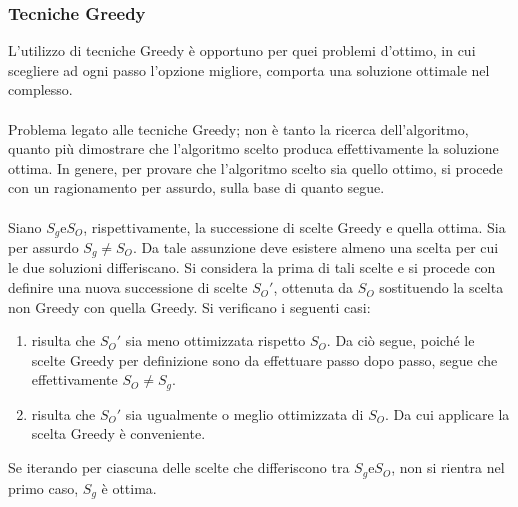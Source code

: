 \documentclass{subfiles}
\begin{document}
\subsubsection{Tecniche Greedy}
L'utilizzo di tecniche Greedy è opportuno per quei problemi d'ottimo, in cui scegliere ad ogni passo l'opzione migliore, comporta una soluzione ottimale nel complesso.
\\ \\
Problema legato alle tecniche Greedy; non è tanto la ricerca dell'algoritmo, quanto più dimostrare che l'algoritmo scelto produca effettivamente la soluzione ottima.
In genere, per provare che l'algoritmo scelto sia quello ottimo, si procede con un ragionamento per assurdo, sulla base di quanto segue.
\\ \\
Siano \(S_{g} \text{e} S_{O}\), rispettivamente, la successione di scelte Greedy e quella ottima.
Sia per assurdo \(S_{g} \neq S_{O}\). Da tale assunzione deve esistere almeno una scelta per cui le due soluzioni differiscano.
Si considera la prima di tali scelte e si procede con definire una nuova successione di scelte \(S_{O}'\), ottenuta da \(S_{O}\) sostituendo la scelta non Greedy con quella Greedy.
Si verificano i seguenti casi:
\begin{enumerate}
    \item risulta che \(S_{O}'\) sia meno ottimizzata rispetto \(S_{O}\). Da ciò segue,
          poiché le scelte Greedy per definizione sono da effettuare passo dopo passo, segue che effettivamente \(S_{O} \neq S_{g}\).
    \item risulta che \(S_{O}'\) sia ugualmente o meglio ottimizzata di \(S_{O}\). Da cui applicare la scelta Greedy è conveniente.
\end{enumerate}

Se iterando per ciascuna delle scelte che differiscono tra \(S_{g} \text{e} S_{O}\), non si rientra nel primo caso, \(S_{g}\) è ottima.
\end{document}
